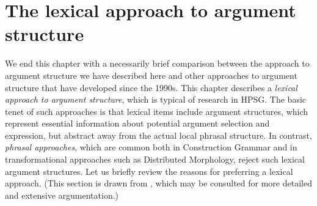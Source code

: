 \documentclass[output=paper
                ,modfonts
                ,nonflat
	        ,collection
	        ,collectionchapter
	        ,collectiontoclongg
 	        ,biblatex
                ,babelshorthands
                ,newtxmath
                ,draftmode
                ,colorlinks, citecolor=brown
]{./langsci/langscibook}
\begin{document}

\section{The lexical approach to argument structure}
\label{lexicalapproach}

We end this chapter with a necessarily brief comparison between the approach to argument structure we have described here and other approaches to argument structure that have developed since the 1990s.
This chapter describes a \textit{lexical approach to argument structure}, which is typical of research in HPSG.  The basic tenet of such approaches is that lexical items include argument structures, which represent essential information about potential argument selection and expression, but
abstract away from the actual local phrasal structure.  In contrast, \emph{phrasal approaches}, which
are common both in Construction Grammar  and in transformational approaches such as Distributed Morphology, reject such lexical argument structures.   Let us briefly review the reasons for preferring a lexical approach. (This section is drawn from \citealt{MWArgSt}, which may be consulted for more detailed and extensive argumentation.) 
\end{document}
